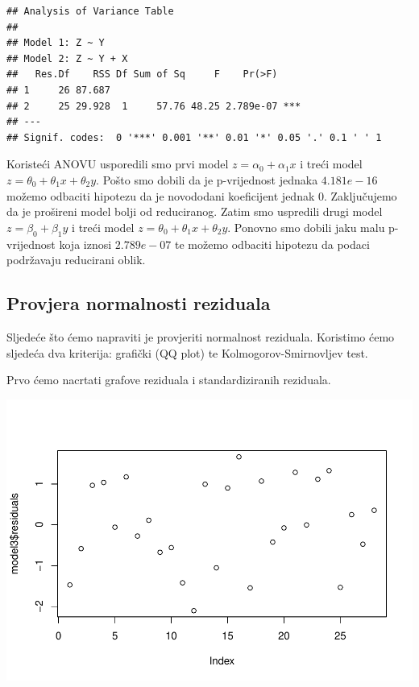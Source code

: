 \documentclass[]{article}
\newenvironment{Shaded}{\begin{snugshade}}{\end{snugshade}}
\newcommand{\KeywordTok}[1]{\textcolor[rgb]{0.13,0.29,0.53}{\textbf{{#1}}}}
\newcommand{\NormalTok}[1]{{#1}}
\begin{document}
\begin{verbatim}
## Analysis of Variance Table
## 
## Model 1: Z ~ Y
## Model 2: Z ~ Y + X
##   Res.Df    RSS Df Sum of Sq     F    Pr(>F)    
## 1     26 87.687                                 
## 2     25 29.928  1     57.76 48.25 2.789e-07 ***
## ---
## Signif. codes:  0 '***' 0.001 '**' 0.01 '*' 0.05 '.' 0.1 ' ' 1
\end{verbatim}

Koristeći ANOVU usporedili smo prvi model \(z = \alpha_0 + \alpha_1 x \)
i treći model \(z = \theta_0 + \theta_1 x + \theta_2 y \). Pošto smo
dobili da je p-vrijednost jednaka \(4.181e-16\) možemo odbaciti hipotezu
da je novododani koeficijent jednak 0. Zaključujemo da je prošireni
model bolji od reduciranog. Zatim smo uspredili drugi model
\(z = \beta_0 + \beta_1 y \) i treći model
\(z = \theta_0 + \theta_1 x + \theta_2 y \). Ponovno smo dobili jaku
malu p-vrijednost koja iznosi \(2.789e-07\) te možemo odbaciti hipotezu
da podaci podržavaju reducirani oblik.

\subsection{Provjera normalnosti
reziduala}\label{provjera-normalnosti-reziduala-2}

Sljedeće što ćemo napraviti je provjeriti normalnost reziduala.
Koristimo ćemo sljedeća dva kriterija: grafički (QQ plot) te
Kolmogorov-Smirnovljev test.

Prvo ćemo nacrtati grafove reziduala i standardiziranih reziduala.

\begin{Shaded}
\end{Shaded}

\includegraphics{Izvjestaj_files/figure-latex/unnamed-chunk-36-1.pdf}
\end{document}
